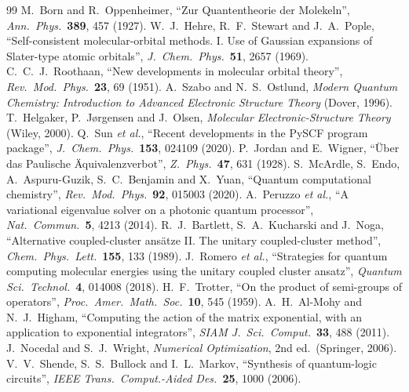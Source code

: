 \documentclass[10pt,a4paper]{article}
\begin{document}
\begin{thebibliography}{99}\small\setlength{\itemsep}{1pt}
 M.~Born and R.~Oppenheimer, ``Zur Quantentheorie der Molekeln'', \emph{Ann.\ Phys.}\ \textbf{389}, 457 (1927).
 W.~J.~Hehre, R.~F.~Stewart and J.~A.~Pople, ``Self-consistent molecular-orbital methods. I. Use of Gaussian expansions of Slater-type atomic orbitals'', \emph{J.\ Chem.\ Phys.}\ \textbf{51}, 2657 (1969).
 C.~C.~J.~Roothaan, ``New developments in molecular orbital theory'', \emph{Rev.\ Mod.\ Phys.}\ \textbf{23}, 69 (1951).
 A.~Szabo and N.~S.~Ostlund, \emph{Modern Quantum Chemistry: Introduction to Advanced Electronic Structure Theory} (Dover, 1996).
 T.~Helgaker, P.~J{\o}rgensen and J.~Olsen, \emph{Molecular Electronic-Structure Theory} (Wiley, 2000).
 Q.~Sun \emph{et al.}, ``Recent developments in the PySCF program package'', \emph{J.\ Chem.\ Phys.}\ \textbf{153}, 024109 (2020).
 P.~Jordan and E.~Wigner, ``{\"U}ber das Paulische {\"A}quivalenzverbot'', \emph{Z.\ Phys.}\ \textbf{47}, 631 (1928).
 S.~McArdle, S.~Endo, A.~Aspuru-Guzik, S.~C.~Benjamin and X.~Yuan, ``Quantum computational chemistry'', \emph{Rev.\ Mod.\ Phys.}\ \textbf{92}, 015003 (2020).
 A.~Peruzzo \emph{et al.}, ``A variational eigenvalue solver on a photonic quantum processor'', \emph{Nat.\ Commun.}\ \textbf{5}, 4213 (2014).
 R.~J.~Bartlett, S.~A.~Kucharski and J.~Noga, ``Alternative coupled-cluster ans{\"a}tze II. The unitary coupled-cluster method'', \emph{Chem.\ Phys.\ Lett.}\ \textbf{155}, 133 (1989).
 J.~Romero \emph{et al.}, ``Strategies for quantum computing molecular energies using the unitary coupled cluster ansatz'', \emph{Quantum Sci.\ Technol.}\ \textbf{4}, 014008 (2018).
 H.~F.~Trotter, ``On the product of semi-groups of operators'', \emph{Proc.\ Amer.\ Math.\ Soc.}\ \textbf{10}, 545 (1959).
 A.~H.~Al-Mohy and N.~J.~Higham, ``Computing the action of the matrix exponential, with an application to exponential integrators'', \emph{SIAM J.\ Sci.\ Comput.}\ \textbf{33}, 488 (2011).
 J.~Nocedal and S.~J.~Wright, \emph{Numerical Optimization}, 2nd ed.\ (Springer, 2006).
 V.~V.~Shende, S.~S.~Bullock and I.~L.~Markov, ``Synthesis of quantum-logic circuits'', \emph{IEEE Trans.\ Comput.-Aided Des.}\ \textbf{25}, 1000 (2006).

\end{thebibliography}
\end{document}
